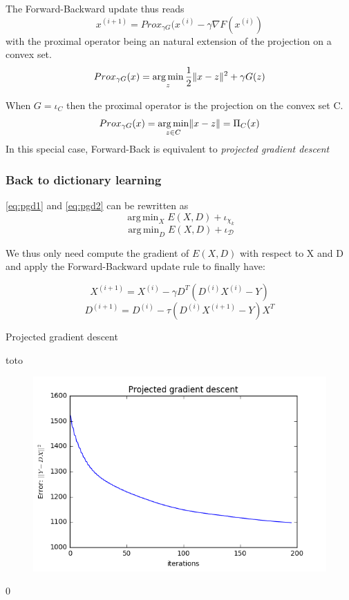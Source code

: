 \documentclass[a4paper,11pt]{article}
\DeclarePairedDelimiter\norm{\lVert}{\rVert} %
\DeclareMathOperator*{\argmin}{arg\,min} %
\begin{document}
The Forward-Backward update thus reads
$$x^{(i+1)} = Prox_{\gamma G} (x^{(i)} - \gamma \nabla F(x^{(i)})$$
with the proximal operator being an natural extension of the projection on a convex set.
$$Prox_{\gamma G}(x) = \argmin_z \frac{1}{2} \norm{x - z}^2 + \gamma G(z)$$

When $G = \iota_C$ then the proximal operator is the projection on the convex set C.
$$Prox_{\gamma G}(x) = \argmin_{z \in C} \norm{x - z} = \Pi_C(x)$$
In this special case, Forward-Back is equivalent to \emph{projected gradient descent}


\subsubsection*{Back to dictionary learning}
\ref{eq:pgd1} and \ref{eq:pgd2} can be rewritten as
$$\argmin_X E(X,D) + \iota_{\chi_k}$$
$$\argmin_D E(X,D) + \iota_{\mathcal{D}}$$

We thus only need compute the gradient of $E(X,D)$ with respect to X and D and apply the Forward-Backward update rule to finally have:

$$ X^{(i+1)} = X^{(i)} - \gamma D^T (D^{(i)}X^{(i)} - Y) $$
$$ D^{(i+1)} = D^{(i)} - \tau (D^{(i)}X^{(i+1)} - Y) X^T $$

\begin{algorithm}
\caption{Projected gradient descent}\label{pgd}
\begin{algorithmic}[1]
\State toto
\end{algorithmic}
\end{algorithm}

\begin{figure}[!htbp]
\centering
  \includegraphics[width=\linewidth]{projected_gradient_descent.png}
\end{figure}0
\end{document}
